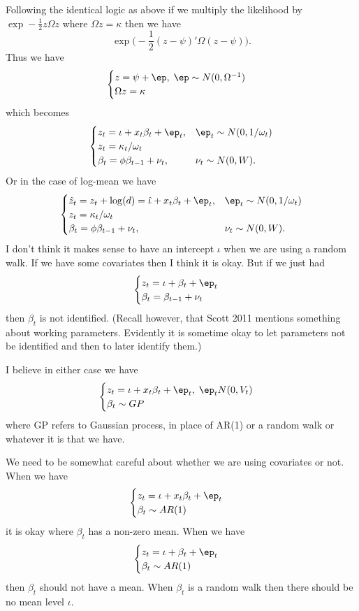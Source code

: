 \documentclass{article}
\begin{document}
Following the identical logic as above if we multiply the likelihood by
$\exp - \frac{1}{2} z \Omega z$ where $\Omega z = \kappa$ then we have
\[
\exp \Big( -\frac{1}{2} (z - \psi)' \Omega (z- \psi) \Big).
\]
Thus we have
\[
\begin{cases}
z = \psi + \ep, \; \ep \sim N(0, \Omega^{-1}) \\
\Omega z = \kappa
\end{cases}
\]
which becomes
\[
\begin{cases}
z_t = \iota + x_t \beta_t + \ep_t, & \ep_t \sim N(0, 1/\omega_t) \\
z_t = \kappa_t / \omega_t \\
\beta_t = \phi \beta_{t-1} + \nu_t, & \nu_t \sim N(0, W).
\end{cases}
\]
Or in the case of log-mean we have
\[
\begin{cases}
\hat z_t = z_t + \log(d) = \hat \iota + x_t \beta_t + \ep_t, 
  & \ep_t \sim N(0, 1/\omega_t) \\
z_t = \kappa_t / \omega_t \\
\beta_t = \phi \beta_{t-1} + \nu_t, & \nu_t \sim N(0, W).
\end{cases}
\]
I don't think it makes sense to have an intercept $\iota$ when we are using a
random walk.  If we have some covariates then I think it is okay.  But if we
just had
\[
\begin{cases}
z_t = \iota + \beta_t + \ep_t \\
\beta_t = \beta_{t-1} + \nu_t
\end{cases}
\]
then $\beta_t$ is not identified.  (Recall however, that Scott 2011 mentions
something about working parameters.  Evidently it is sometime okay to let
parameters not be identified and then to later identify them.)

I believe in either case we have
\[
\begin{cases}
z_t = \iota + x_t \beta_t + \ep_t, \; \ep_t N(0, V_t) \\
\beta_t \sim GP
\end{cases}
\]
where GP refers to Gaussian process, in place of AR(1) or a random walk or
whatever it is that we have.

We need to be somewhat careful about whether we are using covariates or not.
When we have
\[
\begin{cases}
z_t = \iota + x_t \beta_t + \ep_t \\
\beta_t \sim AR(1)
\end{cases}
\]
it is okay where $\beta_t$ has a non-zero mean.
When we have
\[
\begin{cases}
z_t = \iota + \beta_t + \ep_t \\
\beta_t \sim AR(1)
\end{cases}
\]
then $\beta_t$ should not have a mean.  When $\beta_t$ is a random walk then
there should be no mean level $\iota$.
\end{document}
